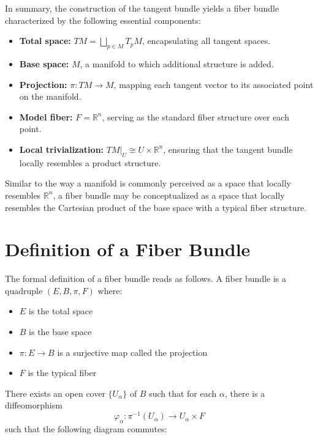 In summary, the construction of the tangent bundle yields a fiber bundle characterized by the following essential components:
\begin{itemize}
  \item \textbf{Total space:} \( TM = \bigsqcup_{p \in M} T_pM \), encapsulating all tangent spaces.
  \item \textbf{Base space:} \( M \), a manifold to which additional structure is added.
  \item \textbf{Projection:} \( \pi: TM \to M \), mapping each tangent vector to its associated point on the manifold.
  \item \textbf{Model fiber:} \( F = \mathbb{R}^n \), serving as the standard fiber structure over each point.
  \item \textbf{Local trivialization:} \( TM|_U \cong U \times \mathbb{R}^n \), ensuring that the tangent bundle locally resembles a product structure.
\end{itemize}

 Similar to the way a manifold is commonly perceived as a space that locally resembles \( \mathbb{R}^n \), a fiber bundle may be conceptualized as a space that locally resembles the Cartesian product of the base space with a typical fiber structure. 


\section{Definition of a Fiber Bundle}

The formal definition of a fiber bundle reads as follows\cite{FredericSchullerTopologicalmanifoldsmanifoldbundlesLec06FredericSchuller2015}\cite{DudekEhreshmanntheoryconnectionprincipalbundlecompendiumphysicists2018}.
A fiber bundle is a quadruple $(E, B, \pi, F)$ where:
\begin{itemize}
  \item $E$ is the total space
  \item $B$ is the base space
  \item $\pi: E \to B$ is a surjective map called the projection
  \item $F$ is the typical fiber
\end{itemize}

There exists an open cover $\{U_\alpha\}$ of $B$ such that for each $\alpha$, there is a diffeomorphism
\[
\varphi_\alpha: \pi^{-1}(U_\alpha) \to U_\alpha \times F
\]
such that the following diagram commutes:


\begin{center}
\end{center}


